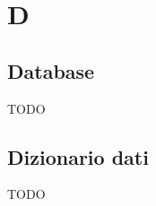 \section{D}

\vspace{2em}
\subsection*{Database}
TODO

\vspace{2em}
\subsection*{Dizionario dati}
TODO